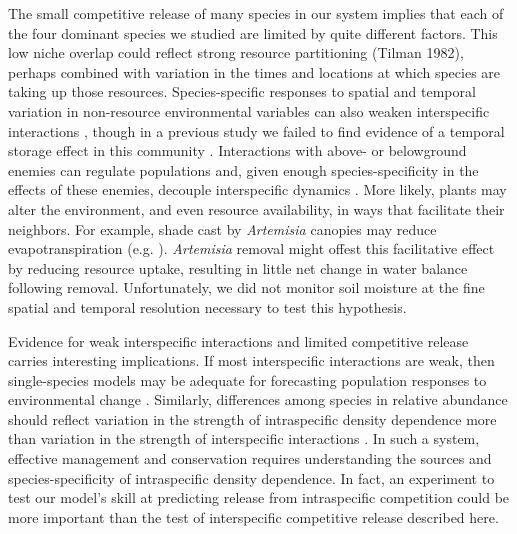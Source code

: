 \documentclass[11pt]{article}
\begin{document}
\begin{doublespacing}
{The small competitive release of many species in our system implies that each of the four dominant species we studied are limited by quite different factors. This low niche overlap could reflect strong resource partitioning (Tilman 1982), perhaps combined with variation in the times and locations at which species are taking up those resources. Species-specific responses to spatial and temporal variation in non-resource environmental variables can also weaken interspecific interactions \citep{chesson_mechanisms_2000}, though in a previous study we failed to find evidence of a temporal storage effect in this community \citep{adler_weak_2009}. Interactions with above- or belowground enemies can regulate populations and, given enough species-specificity in the effects of these enemies, decouple interspecific dynamics \citep{hersh_evaluating_2011,janzen_herbivores_1970,connell_role_1971}.  More likely, plants may alter the environment, and even resource availability, in ways that facilitate their neighbors. For example, shade cast by \textit{Artemisia} canopies may reduce evapotranspiration (e.g. \citealt{Barbier2008}). \textit{Artemisia} removal might offest this facilitative effect by reducing resource uptake, resulting in little net change in water balance following removal.  Unfortunately, we did not monitor soil moisture at the fine spatial and temporal resolution necessary to test this hypothesis.

Evidence for weak interspecific interactions and limited competitive release carries interesting implications. If most interspecific interactions are weak, then single-species models may be adequate for forecasting population responses to environmental change \citep{adler_forecasting_2012,kleinhesselink_indirect_2015}. Similarly, differences among species in relative abundance should reflect variation in the strength of intraspecific density dependence more than variation in the strength of interspecific interactions \citep{yenni_strong_2012}. In such a system, effective management and conservation requires understanding the sources and species-specificity of intraspecific density dependence. In fact, an experiment to test our model's skill at predicting release from intraspecific competition could be more important than the test of interspecific competitive release described here.

}
\end{doublespacing}
\end{document}
